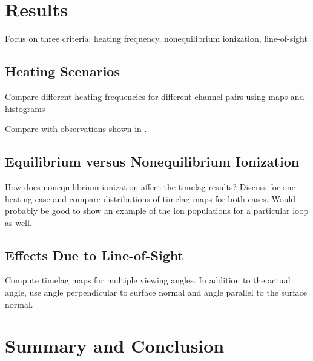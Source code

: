 \documentclass[modern,linenumbers]{aastex62}
\begin{document}
\section{Results}
\label{results}
Focus on three criteria: heating frequency, nonequilibrium ionization, line-of-sight

\subsection{Heating Scenarios}
Compare different heating frequencies for different channel pairs using maps and histograms

Compare with observations shown in \citet{viall_survey_2017}.

\subsection{Equilibrium versus Nonequilibrium Ionization}
How does nonequilibrium ionization affect the timelag results? Discuss for one heating case and compare distributions of timelag maps for both cases. Would probably be good to show an example of the ion populations for a particular loop as well.

\subsection{Effects Due to Line-of-Sight}
Compute timelag maps for multiple viewing angles. In addition to the actual angle, use angle perpendicular to surface normal and angle parallel to the surface normal.

\section{Summary and Conclusion}
\label{conclusions}

\acknowledgments





\end{document}
